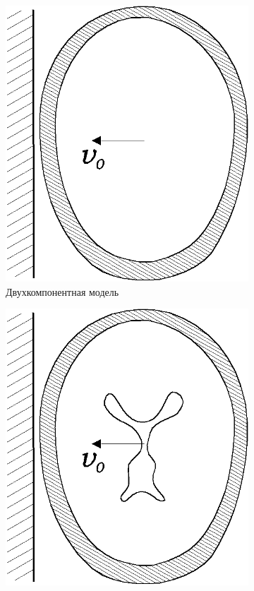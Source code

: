 \begin{figure}[h]
\centering
\begin{subfigure}[b]{0.3\textwidth}
\centering
\includegraphics[width=\textwidth]{png/cranium/2d-problem-1.png}
\caption{Двухкомпонентная модель}
\end{subfigure}
\begin{subfigure}[b]{0.3\textwidth}
\centering
\includegraphics[width=\textwidth]{png/cranium/2d-problem-2.png}

\end{subfigure}
\end{figure}
